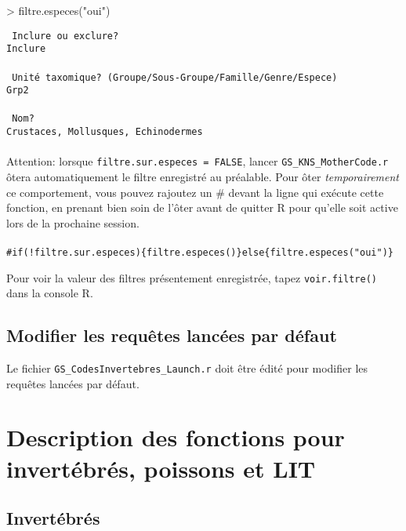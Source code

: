 \documentclass{article}
\begin{document}
\begin{Schunk}
\begin{Sinput}
> filtre.especes("oui")
\end{Sinput}
\end{Schunk}

\texttt{\color{MidnightBlue} Inclure ou exclure? } \\
\indent \indent \texttt{Inclure } \\
\\
\indent \texttt{\color{MidnightBlue} Unité taxomique? (Groupe/Sous-Groupe/Famille/Genre/Espece)} \\
\indent \indent \texttt{Grp2}\\
\\
\indent \texttt{\color{MidnightBlue} Nom?} \\
\indent \indent \texttt{Crustaces, Mollusques, Echinodermes}\\
\\

\noindent Attention: lorsque \texttt{filtre.sur.especes =
  FALSE}, lancer \texttt{GS\_KNS\_MotherCode.r} ôtera automatiquement
le filtre enregistré au préalable. Pour ôter \emph{temporairement} ce comportement,
vous pouvez rajoutez un \# devant la ligne qui exécute cette fonction,
en prenant bien soin de l'ôter avant de quitter R pour qu'elle soit
active lors de la prochaine session. \\
\\
\texttt{\#if(!filtre.sur.especes)\{filtre.especes()\}else\{filtre.especes("oui")\}}

Pour voir la valeur des filtres présentement enregistrée, tapez
\texttt{voir.filtre()} dans la console R.

\subsection*{Modifier les requêtes lancées par défaut}
Le fichier \texttt{GS\_CodesInvertebres\_Launch.r} doit être édité
pour modifier les requêtes lancées par défaut.


\section{Description des fonctions pour invertébrés, poissons et LIT}
\subsection{Invertébrés}
\end{document}
